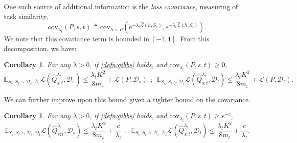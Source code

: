 \documentclass{article}
\theoremstyle{plain}
\newtheorem{corollary}[theorem]{Corollary}
\theoremstyle{definition}
\theoremstyle{remark}
\begin{document}
One such source of additional information is the \emph{loss covariance}, measuring of task similarity,  
%
$$
\mathrm{cov}_{\lambda_t}(P,s,t)\triangleq \mathrm{cov}_{h\sim P}\left (e^{-\lambda_t\hat{\mathcal{L}}(h,S_s)}, e^{-\lambda_t\hat{\mathcal{L}}(h,S_t)}\right ).
$$
%
%
We note that this covariance term is bounded in $[-1, 1]$. From this decomposition, we have:
%
\begin{corollary} \label{thm:cov-2task}
For any $\lambda>0$, if \eqref{defn:gibbs} holds, and $\mathrm{cov}_{\lambda_t}(P,s,t)\geq 0$, 
%
\begin{equation*} 
\mathbb{E}_{S_s,S_t\sim \mathcal{D}_s,\mathcal{D}_t}\mathcal{L}( \hat{Q}^{\lambda_t}_{s:t},\mathcal{D}_s)\leq \frac{\lambda_t K^2}{8m_s}+\mathcal{L}(P,\mathcal{D}_s)~~;~~
%
\mathbb{E}_{S_s,S_t\sim \mathcal{D}_s}\mathcal{L}( \hat{Q}^{\lambda_t}_{s:t},\mathcal{D}_t)\leq \frac{\lambda_t K^2}{8m_t}+\mathcal{L}(P,\mathcal{D}_t). 
\end{equation*}
\end{corollary}

We can further improve upon this bound given a tighter bound on the covariance.
%
\begin{corollary}
\label{thm:cov-2task-highcov}
For any $\lambda>0$, if \eqref{defn:gibbs} holds, and $\mathrm{cov}_{\lambda_t}(P,s,t)\geq e^{-c}$,    
%
\begin{equation*} 
\mathbb{E}_{S_s,S_t\sim \mathcal{D}_s,\mathcal{D}_t}\mathcal{L}( \hat{Q}^{\lambda_t}_{s:t},\mathcal{D}_s)\leq \frac{\lambda_t K^2}{8m_s}+\frac{c}{\lambda_t}~~
;~~ 
\mathbb{E}_{S_s,S_t\sim \mathcal{D}_s,\mathcal{D}_t}\mathcal{L}( \hat{Q}^{\lambda_t}_{s:t},\mathcal{D}_t)\leq \frac{\lambda_t K^2}{8m_t}+\frac{c}{\lambda_t} .
\end{equation*}
\end{corollary}
\end{document}
